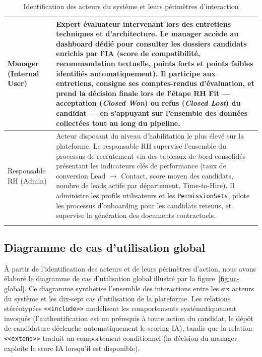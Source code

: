 \begin{longtable}{|p{4cm}|p{11cm}|}
Manager (Internal User) & Expert évaluateur intervenant lors des entretiens techniques et d'architecture. Le manager accède au dashboard dédié pour consulter les dossiers candidats enrichis par l'IA (score de compatibilité, recommandation textuelle, points forts et points faibles identifiés automatiquement). Il participe aux entretiens, consigne ses comptes-rendus d'évaluation, et prend la décision finale lors de l'étape RH Fit — acceptation (\textit{Closed Won}) ou refus (\textit{Closed Lost}) du candidat — en s'appuyant sur l'ensemble des données collectées tout au long du pipeline. \\
\hline

Responsable RH (Admin) & Acteur disposant du niveau d'habilitation le plus élevé sur la plateforme. Le responsable RH supervise l'ensemble du processus de recrutement via des tableaux de bord consolidés présentant les indicateurs clés de performance (taux de conversion Lead $\rightarrow$ Contact, score moyen des candidats, nombre de leads actifs par département, Time-to-Hire). Il administre les profils utilisateurs et les \texttt{PermissionSets}, pilote les processus d'onboarding pour les candidats retenus, et supervise la génération des documents contractuels. \\
\hline

\caption{Identification des acteurs du système et leurs périmètres d'interaction}
\label{tab:acteurs}
\end{longtable}

\FloatBarrier

\subsection{Diagramme de cas d'utilisation global}

À partir de l'identification des acteurs et de leurs périmètres d'action, nous avons élaboré le diagramme de cas d'utilisation global illustré par la figure~\ref{fig:uc-global}. Ce diagramme synthétise l'ensemble des interactions entre les six acteurs du système et les dix-sept cas d'utilisation de la plateforme. Les relations stéréotypées \texttt{<<include>>} modélisent les comportements systématiquement invoqués (l'authentification est un prérequis à toute action du candidat, le dépôt de candidature déclenche automatiquement le scoring IA), tandis que la relation \texttt{<<extend>>} traduit un comportement conditionnel (la décision du manager exploite le score IA lorsqu'il est disponible).


